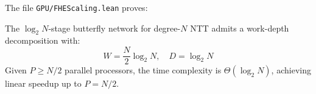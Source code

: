 The file \texttt{GPU/FHEScaling.lean} proves:

\begin{proposition}
The $\log_2 N$-stage butterfly network for degree-$N$ NTT admits a work-depth decomposition with:
\begin{equation}
  W = \frac{N}{2} \log_2 N, \quad D = \log_2 N
\end{equation}
Given $P \geq N/2$ parallel processors, the time complexity is $\Theta(\log_2 N)$, achieving linear speedup up to $P = N/2$.
\end{proposition}

